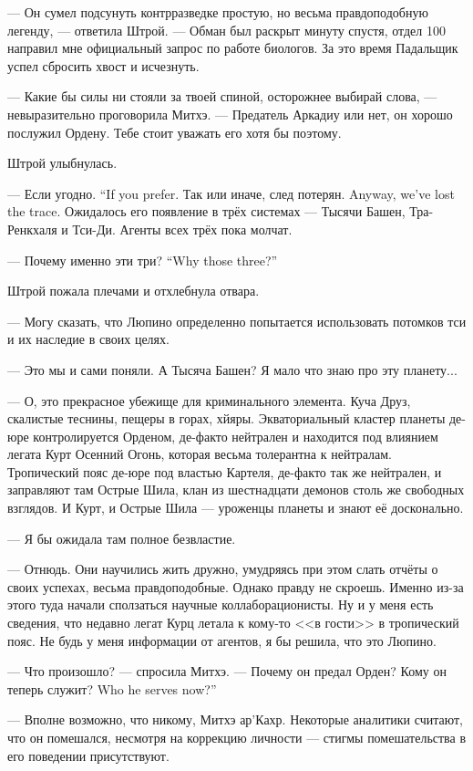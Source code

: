 --- Он сумел подсунуть контрразведке простую, но весьма правдоподобную легенду, --- ответила Штрой.
--- Обман был раскрыт минуту спустя, отдел 100 направил мне официальный запрос по работе биологов.
За это время Падальщик успел сбросить хвост и исчезнуть.

--- Какие бы силы ни стояли за твоей спиной, осторожнее выбирай слова, --- невыразительно проговорила Митхэ.
--- Предатель Аркадиу или нет, он хорошо послужил Ордену.
Тебе стоит уважать его хотя бы поэтому.

Штрой улыбнулась.

{--- Если угодно.}
{``If you prefer.}
{Так или иначе, след потерян.}
{Anyway, we've lost the trace.}
Ожидалось его появление в трёх системах --- Тысячи Башен, Тра-Ренкхаля и Тси-Ди.
Агенты всех трёх пока молчат.

{--- Почему именно эти три?}
{``Why those three?''}

Штрой пожала плечами и отхлебнула отвара.

--- Могу сказать, что Люпино определенно попытается использовать потомков тси и их наследие в своих целях.

--- Это мы и сами поняли.
А Тысяча Башен?
Я мало что знаю про эту планету...

--- О, это прекрасное убежище для криминального элемента.
Куча Друз, скалистые теснины, пещеры в горах, хйяры.
Экваториальный кластер планеты де-юре контролируется Орденом, де-факто нейтрален и находится под влиянием легата Курт Осенний Огонь, которая весьма толерантна к нейтралам.
Тропический пояс де-юре под властью Картеля, де-факто так же нейтрален, и заправляют там Острые Шила, клан из шестнадцати демонов столь же свободных взглядов.
И Курт, и Острые Шила --- уроженцы планеты и знают её досконально.

--- Я бы ожидала там полное безвластие.

--- Отнюдь.
Они научились жить дружно, умудряясь при этом слать отчёты о своих успехах, весьма правдоподобные.
Однако правду не скроешь.
Именно из-за этого туда начали сползаться научные коллаборационисты.
Ну и у меня есть сведения, что недавно легат Курц летала к кому-то <<в гости>> в тропический пояс.
Не будь у меня информации от агентов, я бы решила, что это Люпино.

--- Что произошло? --- спросила Митхэ.
--- Почему он предал Орден?
{Кому он теперь служит?}
{Who he serves now?''}

--- Вполне возможно, что никому, Митхэ ар’Кахр.
Некоторые аналитики считают, что он помешался, несмотря на коррекцию личности --- стигмы помешательства в его поведении присутствуют.

